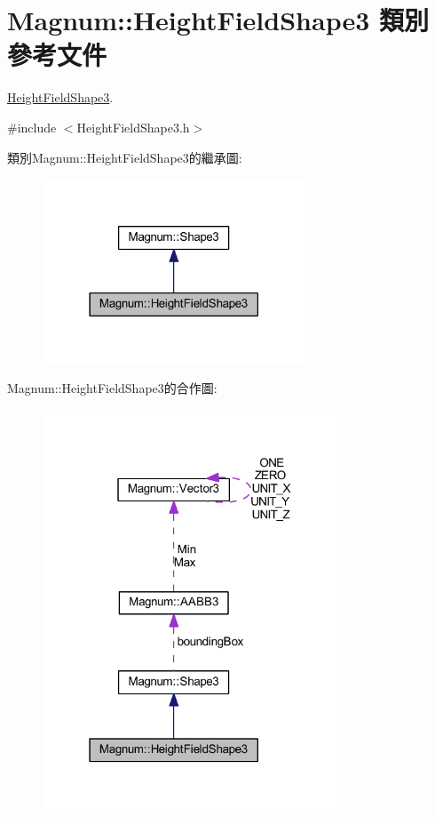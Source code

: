 \hypertarget{class_magnum_1_1_height_field_shape3}{}\section{Magnum\+:\+:Height\+Field\+Shape3 類別 參考文件}
\label{class_magnum_1_1_height_field_shape3}


\hyperlink{class_magnum_1_1_height_field_shape3}{Height\+Field\+Shape3}.  




{\ttfamily \#include $<$Height\+Field\+Shape3.\+h$>$}



類別\+Magnum\+:\+:Height\+Field\+Shape3的繼承圖\+:\nopagebreak
\begin{figure}[H]
\begin{center}
\leavevmode
\includegraphics[width=222pt]{class_magnum_1_1_height_field_shape3__inherit__graph}
\end{center}
\end{figure}


Magnum\+:\+:Height\+Field\+Shape3的合作圖\+:\nopagebreak
\begin{figure}[H]
\begin{center}
\leavevmode
\includegraphics[width=250pt]{class_magnum_1_1_height_field_shape3__coll__graph}
\end{center}
\end{figure}
